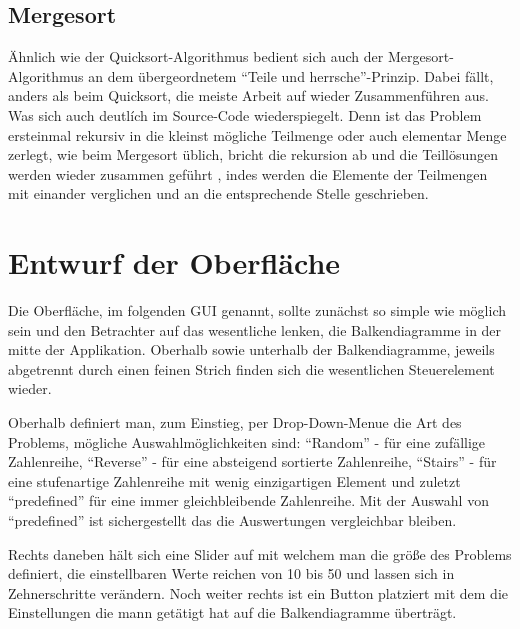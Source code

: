 \subsection{Mergesort}
Ähnlich wie der Quicksort-Algorithmus bedient sich auch der Mergesort-Algorithmus an dem übergeordnetem "`Teile und herrsche"'-Prinzip.
Dabei fällt, anders als beim Quicksort, die meiste Arbeit auf wieder Zusammenführen aus. Was sich auch deutlích im Source-Code wiederspiegelt.
Denn ist das Problem ersteinmal rekursiv in die kleinst mögliche Teilmenge oder auch 
elementar Menge zerlegt, wie beim Mergesort üblich, bricht die rekursion ab und die Teillösungen werden wieder zusammen geführt 
\parencite[S.24]{taschenbuch}, indes werden die
Elemente der Teilmengen mit einander verglichen und an die entsprechende Stelle geschrieben.\parencite[vgl.][]{mergesort}
\newpage
\section{Entwurf der Oberfläche}
Die Oberfläche, im folgenden GUI genannt, sollte zunächst so simple wie möglich sein und den Betrachter auf das wesentliche lenken, die Balkendiagramme in
der mitte der Applikation. Oberhalb sowie unterhalb der Balkendiagramme, jeweils abgetrennt durch einen feinen Strich 
finden sich die wesentlichen Steuerelement wieder.

Oberhalb definiert man, zum Einstieg, per Drop-Down-Menue die Art des Problems, mögliche Auswahlmöglichkeiten sind:
"`Random"' - für eine zufällige Zahlenreihe,  "`Reverse"' - für eine absteigend sortierte Zahlenreihe,  "`Stairs"' - für
eine stufenartige Zahlenreihe mit wenig einzigartigen Element und zuletzt  "`predefined"' für eine immer gleichbleibende Zahlenreihe.
Mit der Auswahl von "`predefined"' ist sichergestellt das die Auswertungen vergleichbar bleiben.

Rechts daneben hält sich eine Slider auf mit welchem man die größe des Problems definiert, die einstellbaren Werte reichen von 10 bis 50
und lassen sich in Zehnerschritte verändern. Noch weiter rechts ist ein Button platziert mit dem die Einstellungen die mann getätigt hat auf 
die Balkendiagramme überträgt. 
